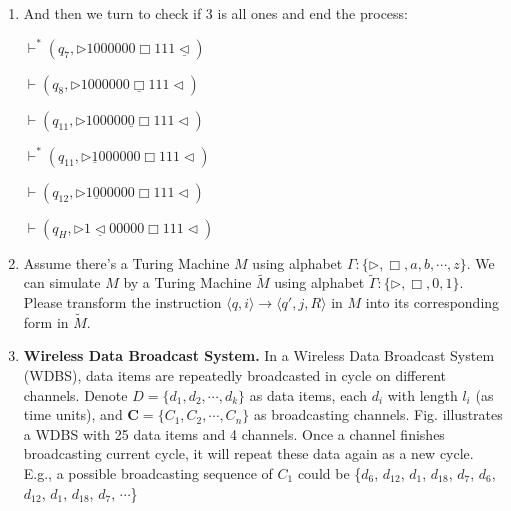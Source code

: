 \documentclass[12pt,a4paper]{article}
\makeatletter
\newtheorem*{solution}{Solution}
\theoremstyle{definition}
\renewenvironment{solution}[1][Solution] {\par\pushQED{\qed}\normalfont\topsep6\p@\@plus6\p@\relax\trivlist\item[\hskip\labelsep\bfseries#1\@addpunct{.}]\ignorespaces}{\popQED\endtrivlist\@endpefalse} \makeatother
\makeatother
\begin{document}
\begin{enumerate}
\begin{solution}
\begin{itemize}
   And then we turn to check if $3$ is all ones and end the process:

   $\vdash^{*} (q_{7},\triangleright  1 0 0 0  0 0 0 \Box 1  1  1 \underline{\triangleleft})$

   $\vdash (q_{8},\triangleright  1 0 0 0  0 0 0 \underline{\Box} 1  1  1 \triangleleft)$
  
   $\vdash (q_{11},\triangleright  1 0 0 0  0 0 \underline{0} \Box 1  1  1 \triangleleft)$

   $\vdash^{*} (q_{11},\triangleright  \underline{1} 0 0 0  0 0 0 \Box 1  1  1 \triangleleft)$

   $\vdash (q_{12},\triangleright  1 \underline{0}  0 0  0 0 0 \Box 1  1  1 \triangleleft)$

   $\vdash (q_{H},\triangleright  1 \underline{\triangleleft}  0 0  0 0 0 \Box 1  1  1 \triangleleft)$


   












\end{itemize}

\end{solution}





\item Assume there's a Turing Machine $M$ using alphabet $\Gamma :\{ \triangleright, \Box, a, b, \cdots, z\}$. We can simulate $M$ by a Turing Machine $\tilde{M}$ using alphabet $\tilde{\Gamma }:\{ \triangleright, \Box, 0, 1\}$. Please transform the instruction $\langle q, i \rangle \rightarrow \langle q',j, R\rangle$ in $M$ into its corresponding form in $\tilde{M}$.


\item \textbf{Wireless Data Broadcast System.}
In a Wireless Data Broadcast System (WDBS), data items are repeatedly broadcasted in cycle on different channels. Denote $D = \{d_1, d_2,\cdots, d_k\}$ as data items, each $d_i$ with length $l_i$ (as time units), and $\mathbf{C}=\{C_1, C_2, \cdots, C_n\}$ as broadcasting channels. Fig. illustrates a WDBS with 25 data items and 4 channels. Once a channel finishes broadcasting current cycle, it will repeat these data again as a new cycle. E.g., a possible broadcasting sequence of $C_1$ could be \{$d_6$, $d_{12}$, $d_1$, $d_{18}$, $d_7$, $d_6$, $d_{12}$, $d_1$, $d_{18}$, $d_7$, $\cdots$\}


\end{enumerate}
\end{document}
